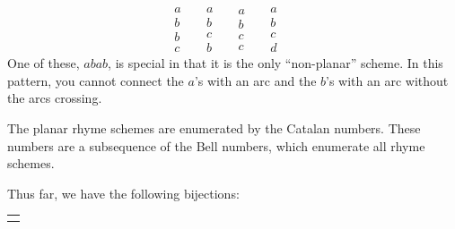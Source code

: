 \documentclass[10pt,]{book}
\theoremstyle{plain}
\theoremstyle{definition}
\theoremstyle{definition}
\numberwithin{equation}{chapter}
\newlength{\panelmax}
\begin{document}
\begin{equation*}
\begin{matrix} a \\ b \\ b \\ c \end{matrix} \quad ~
\begin{matrix} a \\ b \\ c \\ b \end{matrix} \quad ~
\begin{matrix} a \\ b \\ c \\ c \end{matrix} \quad ~
\begin{matrix} a \\ b \\ c \\ d \end{matrix} \quad ~
\end{equation*}
One of these, \(abab\), is special in that it is the only ``non-planar'' scheme. In this pattern, you cannot connect the \(a\)'s with an arc and the \(b\)'s with an arc without the arcs crossing.%
\par
\hypertarget{p-72}{}%
The planar rhyme schemes are enumerated by the Catalan numbers. These numbers are a subsequence of the Bell numbers, which enumerate all rhyme schemes.%
\par
\hypertarget{p-73}{}%
Thus far, we have the following bijections: %
{%
\setlength{\panelmax}{0pt}
\ifdefined\panelboxAtabular\else\newsavebox{\panelboxAtabular}\fi%
\ifdefined\phAtabular\else\newlength{\phAtabular}\fi%
\setlength{\phAtabular}{\ht\panelboxAtabular+\dp\panelboxAtabular}
\settototalheight{\phAtabular}{\usebox{\panelboxAtabular}}
\setlength{\panelmax}{\maxof{\panelmax}{\phAtabular}}
\leavevmode%
\setlength{\tabcolsep}{0\linewidth}
\par\medskip\noindent
\begin{tabular}{@{}*{1}{c}@{}}
\begin{minipage}[c][\panelmax][t]{1\linewidth}\usebox{\panelboxAtabular}\end{minipage}\end{tabular}\\
}%
\end{document}
